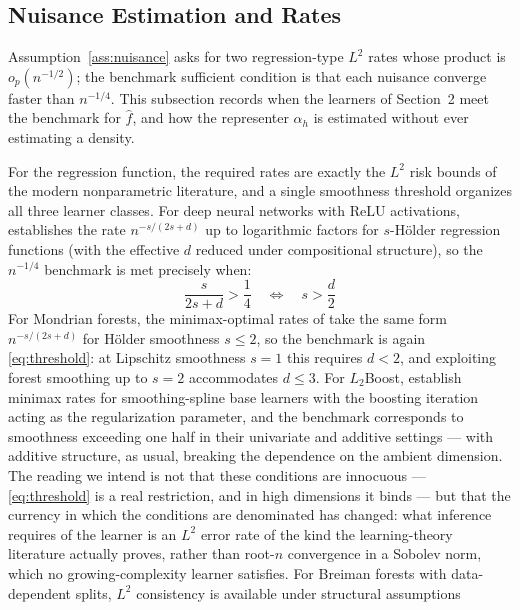 \documentclass[12pt]{article}
\begin{document}
	\subsection{Nuisance Estimation and Rates}
	\label{sec:rates}
	
	Assumption~\ref{ass:nuisance} asks for two regression-type $L^2$ rates whose
	product is $o_p(n^{-1/2})$; the benchmark sufficient condition is that each
	nuisance converge faster than $n^{-1/4}$. This subsection records when the
	learners of Section~2 meet the benchmark for $\hat{f}$, and how the representer
	$\alpha_h$ is estimated without ever estimating a density.
	
	For the regression function, the required rates are exactly the $L^2$ risk bounds
	of the modern nonparametric literature, and a single smoothness threshold
	organizes all three learner classes. For deep neural networks with ReLU
	activations, \citet{schmidthieber2020} establishes the rate
	$n^{-s/(2s + d)}$ up to logarithmic factors for $s$-H\"{o}lder regression
	functions (with the effective $d$ reduced under compositional structure), so the
	$n^{-1/4}$ benchmark is met precisely when:
	\begin{equation}
		\frac{s}{2s + d} > \frac{1}{4}
		\quad \Longleftrightarrow \quad
		s > \frac{d}{2}
		\label{eq:threshold}
	\end{equation}
	For Mondrian forests, the minimax-optimal rates of \citet{mourtada2017mondrian}
	take the same form $n^{-s/(2s + d)}$ for H\"{o}lder smoothness $s \leq 2$, so the
	benchmark is again \eqref{eq:threshold}: at Lipschitz smoothness $s = 1$ this
	requires $d < 2$, and exploiting forest smoothing up to $s = 2$ accommodates
	$d \leq 3$. For $L_2$Boost, \citet{buhlmann2003boosting} establish minimax rates
	for smoothing-spline base learners with the boosting iteration acting as the
	regularization parameter, and the benchmark corresponds to smoothness exceeding
	one half in their univariate and additive settings --- with additive structure,
	as usual, breaking the dependence on the ambient dimension. The reading we intend
	is not that these conditions are innocuous --- \eqref{eq:threshold} is a real
	restriction, and in high dimensions it binds --- but that the currency in which
	the conditions are denominated has changed: what inference requires of the learner
	is an $L^2$ error rate of the kind the learning-theory literature actually
	proves, rather than root-$n$ convergence in a Sobolev norm, which no
	growing-complexity learner satisfies. For Breiman forests with data-dependent
	splits, $L^2$ consistency is available under structural assumptions
\end{document}
